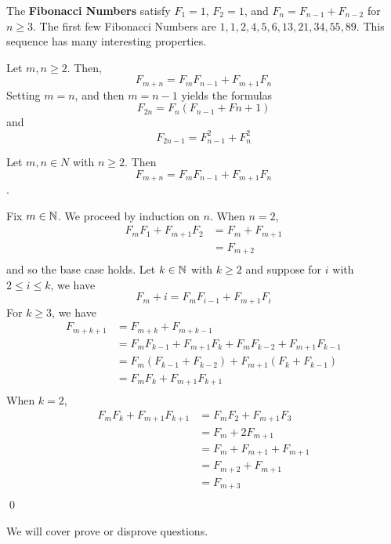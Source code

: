 \documentclass{article}
\begin{document}
\begin{proposition}
  The \textbf{Fibonacci Numbers} satisfy $F_1 = 1$, $F_2 = 1$, and $F_n = F_{n-1} + F_{n-2}$ for $n \geq 3$. The first few Fibonacci Numbers are $1, 1, 2, 4, 5, 6, 13, 21, 34, 55, 89$. This sequence has many interesting properties.
\end{proposition}
\begin{example}
  Let $m, n \geq 2$. Then, \[F_{m+n} = F_mF_{n-1} + F_{m+1}F_n\]
  Setting $m = n$, and then $m = n-1$ yields the formulas
  \[F_{2n} = F_n(F_{n-1} + F{n+1})\] and \[F_{2n-1} = F_{n-1}^2 + F_n^2\]

  Let $m, n \in N$ with $n \geq 2$. Then \[F_{m+n} = F_mF_{n-1} + F_{m+1}F_n\].

  Fix $m \in \mathbb{N}$. We proceed by induction on $n$. When $n = 2$,
  \begin{align*}
    F_mF_1 + F_{m+1}F_2 &= F_m + F_{m+1}\\
    &= F_{m+2}\\
  \end{align*}
  and so the base case holds.
  Let $k \in \mathbb{N}$ with $k \geq 2$ and suppose for $i$ with $2 \leq i \leq k$, we have \[F_m+i = F_mF_{i-1} + F_{m+1}F_i \]
  For $k \geq 3$, we have
  \begin{align*}
    F_{m + k + 1} &= F_{m + k} + F_{m + k - 1} \tag{By def. of fib}\\
    &= F_mF_{k-1} + F_{m+1}F_{k} + F_{m}F_{k-2} + F_{m+1}F_{k-1}\\
    &= F_m(F_{k-1} + F_{k-2}) + F_{m+1}(F_k + F_{k-1})\\
    &= F_mF_k + F_{m+1}F_{k+1}\tag{By def. of fib}\\
  \end{align*}
  When $k=2$,
  \begin{align*}
    F_mF_k + F_{m+1}F_{k+1} &= F_mF_2 + F_{m+1}F_3 \\
    &= F_m + 2F_{m+1}\\
    &= F_m + F_{m+1} + F_{m+1}\\
    &= F_{m+2} + F_{m+1}\\
    &= F_{m+3}\\
  \end{align*}
  \qed
\end{example}
\begin{remark}
  We will cover prove or disprove questions.
\end{remark}
\end{document}
